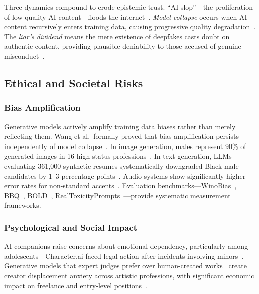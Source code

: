 Three dynamics compound to erode epistemic trust. ``AI slop''---the proliferation of low-quality AI content---floods the internet~\cite{graphite2025aicontent}. \emph{Model collapse} occurs when AI content recursively enters training data, causing progressive quality degradation~\cite{shumailov2024collapse}. The \emph{liar's dividend} means the mere existence of deepfakes casts doubt on authentic content, providing plausible deniability to those accused of genuine misconduct~\cite{chesney2019deepfakes}.


\subsection{Ethical and Societal Risks}
\label{sec:threat-ethics}

\subsubsection{Bias Amplification}
\label{sec:threat-bias}

Generative models actively amplify training data biases rather than merely reflecting them. Wang et al.\ formally proved that bias amplification persists independently of model collapse~\cite{wang2024biasamplification}. In image generation, males represent 90\% of generated images in 16 high-status professions~\cite{sdxl2024bias}. In text generation, LLMs evaluating 361,000 synthetic resumes systematically downgraded Black male candidates by 1--3 percentage points~\cite{pnas2024llmbias}. Audio systems show significantly higher error rates for non-standard accents~\cite{michel2025accentbias}. Evaluation benchmarks---WinoBias~\cite{zhao2018winobias}, BBQ~\cite{parrish2022bbq}, BOLD~\cite{dhamala2021bold}, RealToxicityPrompts~\cite{gehman2020toxicity}---provide systematic measurement frameworks.


\subsubsection{Psychological and Social Impact}
\label{sec:threat-psych}

AI companions raise concerns about emotional dependency, particularly among adolescents---Character.ai faced legal action after incidents involving minors~\cite{characterai2024}. Generative models that expert judges prefer over human-created works~\cite{chi2026creative} create creator displacement anxiety across artistic professions, with significant economic impact on freelance and entry-level positions~\cite{aisafetyreport2026}.


